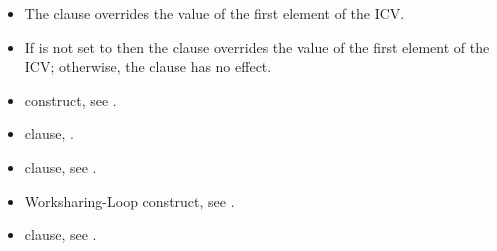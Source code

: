 \linenumbers

\descr
\begin{itemize}
\item The  clause overrides the value of the first element of the
       ICV.

\item If  is not set to  then the  clause 
      overrides the value of the first element of the  ICV; otherwise, 
      the  clause has no effect.
\end{itemize}

\crossreferences
\begin{itemize}
\item {} construct, see
.

\item {} clause,
.

\item {} clause, see
.

\item Worksharing-Loop construct, see
.

\item {} clause, see
.
\end{itemize}






